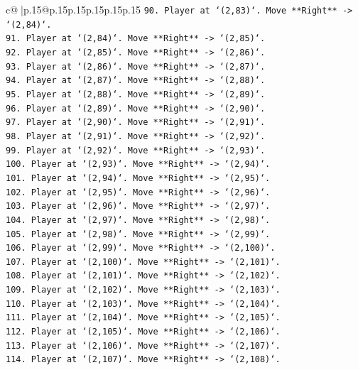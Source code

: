 \documentclass{article}
\begin{document}
{\begin{supertabular}{c@{$\;$}|p{.15\linewidth}@{}p{.15\linewidth}p{.15\linewidth}p{.15\linewidth}p{.15\linewidth}p{.15\linewidth}}
{{{\texttt{90. Player at `(2,83)`. Move **Right** {-}> `(2,84)`.} \\
\texttt{91. Player at `(2,84)`. Move **Right** {-}> `(2,85)`.} \\
\texttt{92. Player at `(2,85)`. Move **Right** {-}> `(2,86)`.} \\
\texttt{93. Player at `(2,86)`. Move **Right** {-}> `(2,87)`.} \\
\texttt{94. Player at `(2,87)`. Move **Right** {-}> `(2,88)`.} \\
\texttt{95. Player at `(2,88)`. Move **Right** {-}> `(2,89)`.} \\
\texttt{96. Player at `(2,89)`. Move **Right** {-}> `(2,90)`.} \\
\texttt{97. Player at `(2,90)`. Move **Right** {-}> `(2,91)`.} \\
\texttt{98. Player at `(2,91)`. Move **Right** {-}> `(2,92)`.} \\
\texttt{99. Player at `(2,92)`. Move **Right** {-}> `(2,93)`.} \\
\texttt{100. Player at `(2,93)`. Move **Right** {-}> `(2,94)`.} \\
\texttt{101. Player at `(2,94)`. Move **Right** {-}> `(2,95)`.} \\
\texttt{102. Player at `(2,95)`. Move **Right** {-}> `(2,96)`.} \\
\texttt{103. Player at `(2,96)`. Move **Right** {-}> `(2,97)`.} \\
\texttt{104. Player at `(2,97)`. Move **Right** {-}> `(2,98)`.} \\
\texttt{105. Player at `(2,98)`. Move **Right** {-}> `(2,99)`.} \\
\texttt{106. Player at `(2,99)`. Move **Right** {-}> `(2,100)`.} \\
\texttt{107. Player at `(2,100)`. Move **Right** {-}> `(2,101)`.} \\
\texttt{108. Player at `(2,101)`. Move **Right** {-}> `(2,102)`.} \\
\texttt{109. Player at `(2,102)`. Move **Right** {-}> `(2,103)`.} \\
\texttt{110. Player at `(2,103)`. Move **Right** {-}> `(2,104)`.} \\
\texttt{111. Player at `(2,104)`. Move **Right** {-}> `(2,105)`.} \\
\texttt{112. Player at `(2,105)`. Move **Right** {-}> `(2,106)`.} \\
\texttt{113. Player at `(2,106)`. Move **Right** {-}> `(2,107)`.} \\
\texttt{114. Player at `(2,107)`. Move **Right** {-}> `(2,108)`.} \\
}}}
\end{supertabular}}
\end{document}
